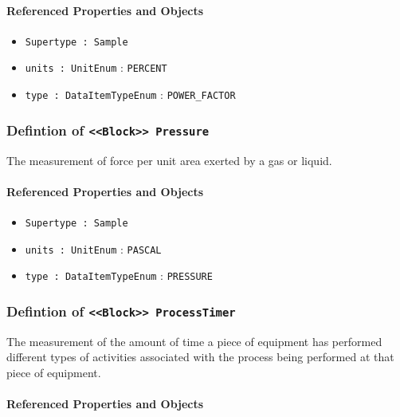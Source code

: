 \FloatBarrier
\paragraph{Referenced Properties and Objects}

\begin{itemize}
\item \texttt{Supertype : Sample}

\item \texttt{units : UnitEnum} : \texttt{PERCENT}

\item \texttt{type : DataItemTypeEnum} : \texttt{POWER_FACTOR}

\end{itemize}
\FloatBarrier
\subsubsection{Defintion of \texttt{<<Block>> Pressure}}
  \label{type:Pressure}

\FloatBarrier

The measurement of force per unit area exerted by a gas or liquid.

\FloatBarrier
\paragraph{Referenced Properties and Objects}

\begin{itemize}
\item \texttt{Supertype : Sample}

\item \texttt{units : UnitEnum} : \texttt{PASCAL}

\item \texttt{type : DataItemTypeEnum} : \texttt{PRESSURE}

\end{itemize}
\FloatBarrier
\subsubsection{Defintion of \texttt{<<Block>> ProcessTimer}}
  \label{type:ProcessTimer}

\FloatBarrier

The measurement of the amount of time a piece of equipment has performed different types of activities associated with the process being performed at that piece of equipment.

\FloatBarrier
\paragraph{Referenced Properties and Objects}

